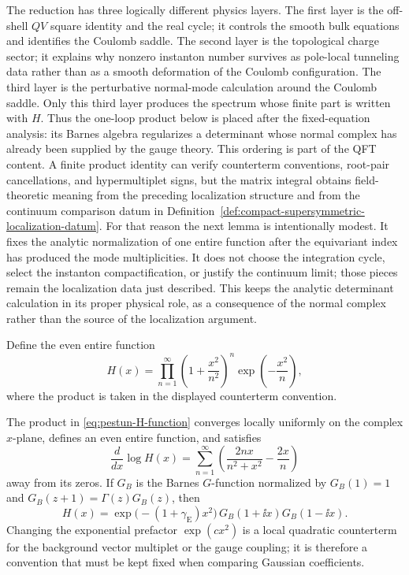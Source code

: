 The reduction has three logically different physics layers.  The first layer is
the off-shell \(QV\) square identity and the real cycle; it controls the smooth
bulk equations and identifies the Coulomb saddle.  The second layer is the
topological charge sector; it explains why nonzero instanton number survives as
pole-local tunneling data rather than as a smooth deformation of the Coulomb
configuration.  The third layer is the perturbative normal-mode calculation
around the Coulomb saddle.  Only this third layer produces the spectrum whose
finite part is written with \(H\).  Thus the one-loop product below is placed
after the fixed-equation analysis: its Barnes algebra regularizes a determinant
whose normal complex has already been supplied by the gauge theory.  This
ordering is part of the QFT content.  A finite product identity can verify
counterterm conventions, root-pair cancellations, and hypermultiplet signs, but
the matrix integral obtains field-theoretic meaning from the preceding
localization structure and from the continuum comparison datum in
Definition~\ref{def:compact-supersymmetric-localization-datum}.
For that reason the next lemma is intentionally modest.  It fixes the analytic
normalization of one entire function after the equivariant index has produced
the mode multiplicities.  It does not choose the integration cycle, select the
instanton compactification, or justify the continuum limit; those pieces remain
the localization data just described.  This keeps the analytic determinant
calculation in its proper physical role, as a consequence of the normal
complex rather than the source of the localization argument.

Define the even entire function
\begin{equation}
  H(x)
  =
  \prod_{n=1}^{\infty}
  \left(1+\frac{x^2}{n^2}\right)^n
  \exp\!\left(-\frac{x^2}{n}\right),
  \label{eq:pestun-H-function}
\end{equation}
where the product is taken in the displayed counterterm convention.

\begin{lemma}
\label{lem:s4-H-function-convention}
The product in \eqref{eq:pestun-H-function} converges locally uniformly on
the complex \(x\)-plane, defines an even entire function, and satisfies
\begin{equation}
  \frac{d}{dx}\log H(x)
  =
  \sum_{n=1}^{\infty}
  \left(
    \frac{2nx}{n^2+x^2}-\frac{2x}{n}
  \right)
  \label{eq:H-log-derivative}
\end{equation}
away from its zeros.  If \(G_B\) is the Barnes \(G\)-function normalized by
\(G_B(1)=1\) and \(G_B(z+1)=\Gamma(z)G_B(z)\), then
\begin{equation}
  H(x)
  =
  \exp\!\bigl(-(1+\gamma_{\mathrm E})x^2\bigr)\,
  G_B(1+\ii x)G_B(1-\ii x).
  \label{eq:H-Barnes-G-convention}
\end{equation}
Changing the exponential prefactor \(\exp(c x^2)\) is a local quadratic
counterterm for the background vector multiplet or the gauge coupling; it is
therefore a convention that must be kept fixed when comparing Gaussian
coefficients.
\end{lemma}

